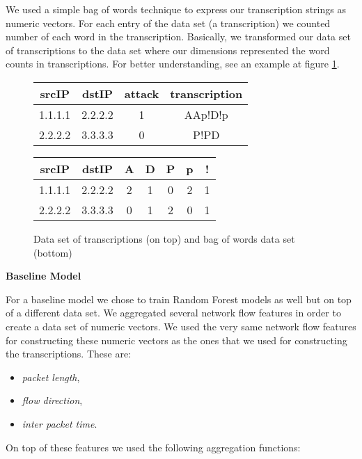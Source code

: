\documentclass{article}
\begin{document}
We used a simple bag of words technique to express our transcription strings as numeric vectors. For each entry of the data set (a transcription) we counted number of each word in the transcription. Basically, we transformed our data set of transcriptions to the data set where our dimensions represented the word counts in transcriptions. For better understanding, see an example at figure \ref{fig-bag-of-words-example}.

\begin{figure}[h!]
\centering
\begin{tabular}{ |c|c|c|c| }
 \hline
 srcIP & dstIP & attack & transcription \\
 \hline
 1.1.1.1 & 2.2.2.2 & 1 & AAp!D!p \\
 2.2.2.2 & 3.3.3.3 & 0 & P!PD \\
 \hline
\end{tabular}

\vspace{0.3cm}

\begin{tabular}{ |c|c|c|c|c|c|c| }
 \hline
 srcIP & dstIP & A & D & P & p & ! \\
 \hline
 1.1.1.1 & 2.2.2.2 & 2 & 1 & 0 & 2 & 1 \\
 2.2.2.2 & 3.3.3.3 & 0 & 1 & 2 & 0 & 1 \\
 \hline
\end{tabular}
\caption{Data set of transcriptions (on top) and bag of words data set (bottom)}
\label{fig-bag-of-words-example}
\end{figure}


\noindent\textbf{Baseline Model}

For a baseline model we chose to train Random Forest models as well but on top of a different data set. We aggregated several network flow features in order to create a data set of numeric vectors. We used the very same network flow features for constructing these numeric vectors as the ones that we used for constructing the transcriptions. These are:

\begin{itemize}
    \item \textit{packet length},
    \item \textit{flow direction},
    \item \textit{inter packet time}.
\end{itemize}

\noindent On top of these features we used the following aggregation functions:
\end{document}
